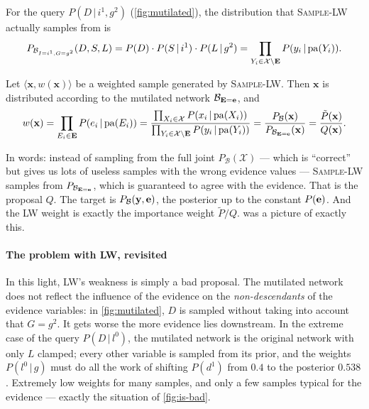\documentclass[11pt, oneside]{book}
\newcommand{\Prob}{\mathbb{P}}           %
\newcommand{\given}{\,\vert\,}           %
\newcommand{\pa}{\mathrm{pa}}            %
\newcommand{\Xall}{\mathcal{X}}          %
\newcommand{\bx}{\mathbf{x}}  \newcommand{\by}{\mathbf{y}}
\begin{document}
For the query $P(D \given i^1, g^2)$ (\cref{fig:mutilated}), the distribution
that \textsc{Sample-LW} actually samples from is
\[
P_{\mathcal{B}_{I = i^1, G = g^2}}(D, S, L) = P(D) \cdot P(S \given i^1) \cdot P(L \given g^2)
= \prod_{Y_i \in \Xall \setminus \bE} P(y_i \given \pa(Y_i)) .
\]

\begin{thmbox}[title={Likelihood weighting is importance sampling}, unbreakable]
Let $\langle \bx, w(\bx) \rangle$ be a weighted sample generated by
\textsc{Sample-LW}. Then $\bx$ is distributed according to the mutilated
network $\mathcal{B}_{\mathbf{E} = \mathbf{e}}$, and
\[
w(\bx) = \prod_{E_i \in \bE} P(e_i \given \pa(E_i))
= \frac{\prod_{X_i \in \Xall} P(x_i \given \pa(X_i))}{\prod_{Y_i \in \Xall \setminus \bE} P(y_i \given \pa(Y_i))}
= \frac{P_{\mathcal{B}}(\bx)}{P_{\mathcal{B}_{\bE = \be}}(\bx)}
= \frac{\tilde P(\bx)}{Q(\bx)} .
\]
\end{thmbox}

In words: instead of sampling from the full joint $P_{\mathcal{B}}(\Xall)$ ---
which is ``correct'' but gives us lots of useless samples with the wrong
evidence values --- \textsc{Sample-LW} samples from $P_{\mathcal{B}_{\mathbf{E} =
\mathbf{e}}}$, which is guaranteed to agree with the evidence. That is the proposal
$Q$. The target is $P_{\mathcal{B}}(\by, \be)$, the posterior up to the
constant $P(\mathbf{e})$. And the LW weight is exactly the importance weight
$\tilde P / Q$.  was a picture of exactly this.

\paragraph{The problem with LW, revisited} In this light, LW's weakness is
simply a bad proposal. The mutilated network does not reflect the influence
of the evidence on the \emph{non-descendants} of the evidence variables: in
\cref{fig:mutilated}, $D$ is sampled without taking into account that $G =
g^2$. It gets worse the more evidence lies downstream. In the extreme case of
the query $P(D \given l^0)$, the mutilated network is the original network
with only $L$ clamped; every other variable is sampled from its prior, and the
weights $P(l^0 \given g)$ must do all the work of shifting $P(d^1)$ from $0.4$
to the posterior $0.538$. Extremely low weights for many samples, and only a
few samples typical for the evidence --- exactly the situation of
\cref{fig:is-bad}.
\end{document}
